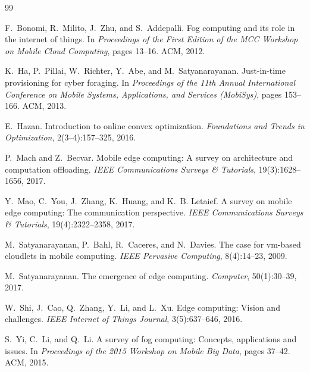 \documentclass[12pt,oneside]{book}
\begin{document}
\begin{thebibliography}{99}

F.~Bonomi, R.~Milito, J.~Zhu, and S.~Addepalli.
\newblock Fog computing and its role in the internet of things.
\newblock In \emph{Proceedings of the First Edition of the MCC Workshop on Mobile
  Cloud Computing}, pages 13--16. ACM, 2012.

K.~Ha, P.~Pillai, W.~Richter, Y.~Abe, and M.~Satyanarayanan.
\newblock Just-in-time provisioning for cyber foraging.
\newblock In \emph{Proceedings of the 11th Annual International Conference on
  Mobile Systems, Applications, and Services (MobiSys)}, pages 153--166. ACM, 2013.

E.~Hazan.
\newblock Introduction to online convex optimization.
\emph{Foundations and Trends in Optimization}, 2(3--4):157--325, 2016.

P.~Mach and Z.~Becvar.
\newblock Mobile edge computing: A survey on architecture and computation
  offloading.
\emph{IEEE Communications Surveys \& Tutorials}, 19(3):1628--1656, 2017.

Y.~Mao, C.~You, J.~Zhang, K.~Huang, and K.~B. Letaief.
\newblock A survey on mobile edge computing: The communication perspective.
\emph{IEEE Communications Surveys \& Tutorials}, 19(4):2322--2358, 2017.

M.~Satyanarayanan, P.~Bahl, R.~Caceres, and N.~Davies.
\newblock The case for vm-based cloudlets in mobile computing.
\emph{IEEE Pervasive Computing}, 8(4):14--23, 2009.

M.~Satyanarayanan.
\newblock The emergence of edge computing.
\emph{Computer}, 50(1):30--39, 2017.

W.~Shi, J.~Cao, Q.~Zhang, Y.~Li, and L.~Xu.
\newblock Edge computing: Vision and challenges.
\emph{IEEE Internet of Things Journal}, 3(5):637--646, 2016.

S.~Yi, C.~Li, and Q.~Li.
\newblock A survey of fog computing: Concepts, applications and issues.
\newblock In \emph{Proceedings of the 2015 Workshop on Mobile Big Data},
  pages 37--42. ACM, 2015.

\end{thebibliography}
\end{document}
